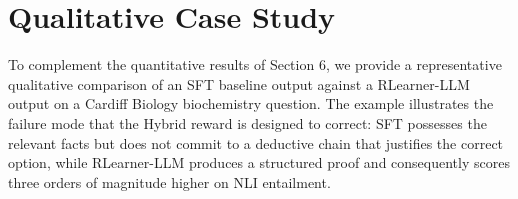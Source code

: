 \begin{table}[h]
\centering
{}
\caption{UK Medicine Year 2, full per-architecture breakdown. Gemma 4 RLearner virtually matches the LLaMA-2-13B peak ($0.3892$ vs $0.3885$) with $\sim 3\times$ fewer effective parameters.}
\label{tab:med_results_2}
\end{table}

\section{Qualitative Case Study}
\label{sec:case_study_appendix}

To complement the quantitative results of Section 6, we provide a representative qualitative comparison of an SFT baseline output against a RLearner-LLM output on a Cardiff Biology biochemistry question. The example illustrates the failure mode that the Hybrid reward is designed to correct: SFT possesses the relevant facts but does not commit to a deductive chain that justifies the correct option, while RLearner-LLM produces a structured proof and consequently scores three orders of magnitude higher on NLI entailment.

